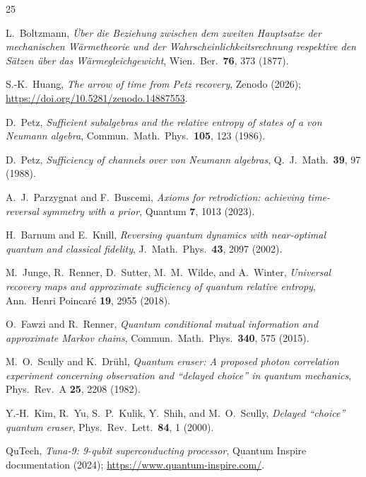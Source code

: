 \documentclass[prl,twocolumn,superscriptaddress,longbibliography,floatfix]{revtex4-2}
\begin{document}
\begin{thebibliography}{25}

L.~Boltzmann,
\textit{\"{U}ber die Beziehung zwischen dem zweiten Hauptsatze der
mechanischen W\"{a}rmetheorie und der Wahrscheinlichkeitsrechnung
respektive den S\"{a}tzen \"{u}ber das W\"{a}rmegleichgewicht},
Wien.\ Ber.\ \textbf{76}, 373 (1877).

S.-K.~Huang,
\textit{The arrow of time from Petz recovery},
Zenodo (2026); \url{https://doi.org/10.5281/zenodo.14887553}.

D.~Petz,
\textit{Sufficient subalgebras and the relative entropy of states
of a von Neumann algebra},
Commun.\ Math.\ Phys.\ \textbf{105}, 123 (1986).

D.~Petz,
\textit{Sufficiency of channels over von Neumann algebras},
Q.\ J.\ Math.\ \textbf{39}, 97 (1988).

A.~J.~Parzygnat and F.~Buscemi,
\textit{Axioms for retrodiction: achieving time-reversal symmetry
with a prior},
Quantum \textbf{7}, 1013 (2023).

H.~Barnum and E.~Knill,
\textit{Reversing quantum dynamics with near-optimal quantum and
classical fidelity},
J.\ Math.\ Phys.\ \textbf{43}, 2097 (2002).

M.~Junge, R.~Renner, D.~Sutter, M.~M.~Wilde, and A.~Winter,
\textit{Universal recovery maps and approximate sufficiency of
quantum relative entropy},
Ann.\ Henri Poincar\'{e} \textbf{19}, 2955 (2018).

O.~Fawzi and R.~Renner,
\textit{Quantum conditional mutual information and approximate
Markov chains},
Commun.\ Math.\ Phys.\ \textbf{340}, 575 (2015).

M.~O.~Scully and K.~Dr\"{u}hl,
\textit{Quantum eraser: A proposed photon correlation experiment
concerning observation and ``delayed choice'' in quantum mechanics},
Phys.\ Rev.\ A \textbf{25}, 2208 (1982).

Y.-H.~Kim, R.~Yu, S.~P.~Kulik, Y.~Shih, and M.~O.~Scully,
\textit{Delayed ``choice'' quantum eraser},
Phys.\ Rev.\ Lett.\ \textbf{84}, 1 (2000).

QuTech,
\textit{Tuna-9: 9-qubit superconducting processor},
Quantum Inspire documentation (2024);
\url{https://www.quantum-inspire.com/}.


\end{thebibliography}
\end{document}
